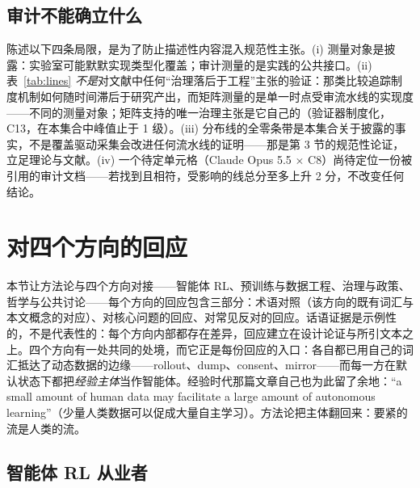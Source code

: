 \documentclass[10pt,fontset=fandol]{ctexart}
\begin{document}
\subsection{审计不能确立什么}

陈述以下四条局限，是为了防止描述性内容混入规范性主张。(i) 测量对象是披露：实验室可能默默实现类型化覆盖；审计测量的是实践的公共接口。(ii) 表~\ref{tab:lines} \emph{不是}对文献中任何“治理落后于工程”主张的验证：那类比较追踪制度机制如何随时间滞后于研究产出，而矩阵测量的是单一时点受审流水线的实现度——不同的测量对象；矩阵支持的唯一治理主张是它自己的（验证器制度化，C13，在本集合中峰值止于 1 级）。(iii) 分布线的全零条带是本集合关于披露的事实，不是覆盖驱动采集会改进任何流水线的证明——那是第 3 节的规范性论证，立足理论与文献。(iv) 一个待定单元格（Claude Opus 5.5 $\times$ C8）尚待定位一份被引用的审计文档——若找到且相符，受影响的线总分至多上升 2 分，不改变任何结论。

\section{对四个方向的回应}

本节让方法论与四个方向对接——智能体 RL、预训练与数据工程、治理与政策、哲学与公共讨论——每个方向的回应包含三部分：术语对照（该方向的既有词汇与本文概念的对应）、对核心问题的回应、对常见反对的回应。话语证据是示例性的，不是代表性的：每个方向内部都存在差异，回应建立在设计论证与所引文本之上。四个方向有一处共同的处境，而它正是每份回应的入口：各自都已用自己的词汇抵达了动态数据的边缘——rollout、dump、consent、mirror——而每一方在默认状态下都把\emph{经验主体}当作智能体。经验时代那篇文章自己也为此留了余地：“a small amount of human data may facilitate a large amount of autonomous learning”（少量人类数据可以促成大量自主学习）\cite{ref3}。方法论把主体翻回来：要紧的流是人类的流。

\subsection{智能体 RL 从业者}
\end{document}

